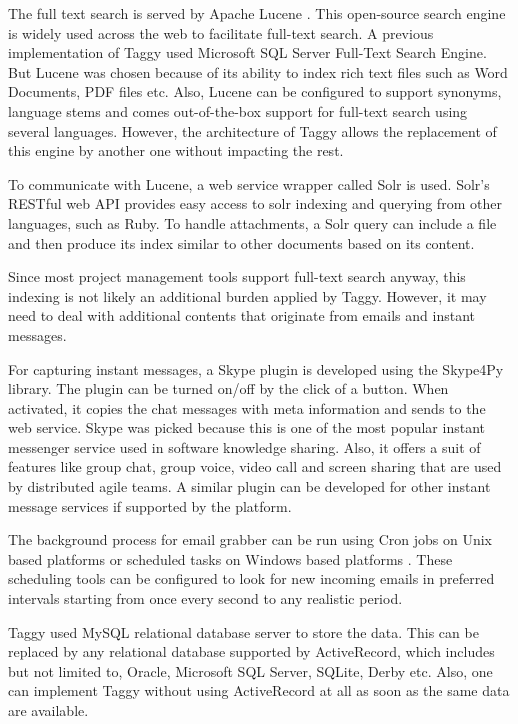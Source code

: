 The full text search is served by Apache Lucene \cite{lucene}. This open-source search engine is widely used across the web to facilitate full-text search. A previous implementation of Taggy used Microsoft SQL Server Full-Text Search Engine\cite{auto_tagging}\cite{sql_server}. But Lucene was chosen because of its ability to index rich text files such as Word Documents, PDF files etc. Also, Lucene can be configured to support synonyms, language stems and comes out-of-the-box support for full-text search using several languages. However, the architecture of Taggy allows the replacement of this engine by another one without impacting the rest.

To communicate with Lucene, a web service wrapper called Solr is used\cite{solr}. Solr's RESTful web API provides easy access to solr indexing and querying from other languages, such as Ruby. To handle attachments, a Solr query can include a file and then produce its index similar to other documents based on its content.

Since most project management tools support full-text search anyway, this indexing is not likely an additional burden applied by Taggy. However, it may need to deal with additional contents that originate from emails and instant messages.

For capturing instant messages, a Skype plugin is developed using the Skype4Py library\cite{skype4py}. The plugin can be turned on/off by the click of a button. When activated, it copies the chat messages with meta information and sends to the web service. Skype was picked because this is one of the most popular instant messenger service used in software knowledge sharing. Also, it offers a suit of features like group chat, group voice, video call and screen sharing that are used by distributed agile teams. A similar plugin can be developed for other instant message services if supported by the platform.

The background process for email grabber can be run using Cron jobs on Unix based platforms or scheduled tasks on Windows based platforms \cite{cron} \cite{scheduled_tasks}. These scheduling tools can be configured to look for new incoming emails in preferred intervals starting from once every second to any realistic period.

Taggy used MySQL relational database server to store the data. This can be replaced by any relational database supported by ActiveRecord, which includes but not limited to, Oracle, Microsoft SQL Server, SQLite, Derby etc\cite{active_record}. Also, one can implement Taggy without using ActiveRecord at all as soon as the same data are available.

